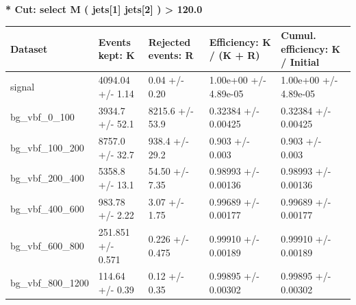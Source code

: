 \documentclass[a4paper, 10pt]{article}
\begin{document}
\textbf{* Cut: select M ( jets[1] jets[2] ) > 120.0}\\
   \begin{table}[H]
  \begin{center}
    \begin{tabular}{|m{20.0mm}|m{27.0mm}|m{27.0mm}|m{33.0mm}|m{32.0mm}|}
      \hline
      {\cellcolor{yellow}         Dataset}& {\cellcolor{yellow}         Events kept:
          K}& {\cellcolor{yellow}         Rejected events:
          R}& {\cellcolor{yellow}         Efficiency:
          K /\- (K + R)}& {\cellcolor{yellow}         Cumul. efficiency:
          K /\- Initial}\\
      \hline
      {\cellcolor{white}         signal}& {\cellcolor{white}         4094.04 +/\-- 1.14}& {\cellcolor{white}         0.04 +/\-- 0.20}& {\cellcolor{white}         1.00e+00 +/\-- 4.89e-05}& {\cellcolor{white}         1.00e+00 +/\-- 4.89e-05}\\
      \hline
      {\cellcolor{white}         bg\_vbf\_0\_100}& {\cellcolor{white}         3934.7 +/\-- 52.1}& {\cellcolor{white}         8215.6 +/\-- 53.9}& {\cellcolor{white}         0.32384 +/\-- 0.00425}& {\cellcolor{white}         0.32384 +/\-- 0.00425}\\
      \hline
      {\cellcolor{white}         bg\_vbf\_100\_200}& {\cellcolor{white}         8757.0 +/\-- 32.7}& {\cellcolor{white}         938.4 +/\-- 29.2}& {\cellcolor{white}         0.903 +/\-- 0.003}& {\cellcolor{white}         0.903 +/\-- 0.003}\\
      \hline
      {\cellcolor{white}         bg\_vbf\_200\_400}& {\cellcolor{white}         5358.8 +/\-- 13.1}& {\cellcolor{white}         54.50 +/\-- 7.35}& {\cellcolor{white}         0.98993 +/\-- 0.00136}& {\cellcolor{white}         0.98993 +/\-- 0.00136}\\
      \hline
      {\cellcolor{white}         bg\_vbf\_400\_600}& {\cellcolor{white}         983.78 +/\-- 2.22}& {\cellcolor{white}         3.07 +/\-- 1.75}& {\cellcolor{white}         0.99689 +/\-- 0.00177}& {\cellcolor{white}         0.99689 +/\-- 0.00177}\\
      \hline
      {\cellcolor{white}         bg\_vbf\_600\_800}& {\cellcolor{white}         251.851 +/\-- 0.571}& {\cellcolor{white}         0.226 +/\-- 0.475}& {\cellcolor{white}         0.99910 +/\-- 0.00189}& {\cellcolor{white}         0.99910 +/\-- 0.00189}\\
      \hline
      {\cellcolor{white}         bg\_vbf\_800\_1200}& {\cellcolor{white}         114.64 +/\-- 0.39}& {\cellcolor{white}         0.12 +/\-- 0.35}& {\cellcolor{white}         0.99895 +/\-- 0.00302}& {\cellcolor{white}         0.99895 +/\-- 0.00302}\\

\end{tabular}
\end{center}
\end{table}
\end{document}

